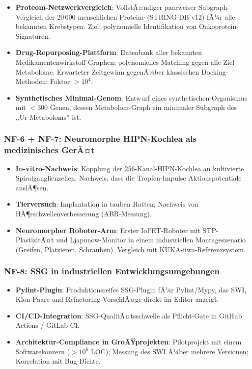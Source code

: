 ﻿\documentclass[a4paper,12pt]{scrreprt}
\theoremstyle{definition}
\begin{document}
\begin{itemize}
  \item \textbf{Proteom-Netzwerkvergleich}: VollstÃ¤ndiger paarweiser
    Subgraph-Vergleich der 20\,000 menschlichen Proteine (STRING-DB v12)
    fÃ¼r alle bekannten Krebstypen. Ziel: polynomielle Identifikation
    von Onkoprotein-Signaturen.
  \item \textbf{Drug-Repurposing-Plattform}: Datenbank aller bekannten
    Medikamentenwirkstoff-Graphen; polynomielles Matching gegen alle
    Ziel-Metabolome. Erwarteter Zeitgewinn gegenÃ¼ber klassischen
    Docking-Methoden: Faktor $> 10^4$.
  \item \textbf{Synthetisches Minimal-Genom}: Entwurf eines synthetischen
    Organismus mit $< 300$ Genen, dessen Metabolom-Graph ein minimaler
    Subgraph des ,,Ur-Metaboloms'' ist.
\end{itemize}

\subsubsection{NF-6 + NF-7: Neuromorphe HIPN-Kochlea als medizinisches GerÃ¤t}

\begin{itemize}
  \item \textbf{In-vitro-Nachweis}: Kopplung der 256-Kanal-HIPN-Kochlea
    an kultivierte Spiralganglienzellen. Nachweis, dass die
    Tropfen-Impulse Aktionspotentiale auslÃ¶sen.
  \item \textbf{Tierversuch}: Implantation in tauben Ratten; Nachweis
    von HÃ¶rschwellenverbesserung (ABR-Messung).
  \item \textbf{Neuromorpher Roboter-Arm}: Erster IoFET-Roboter mit
    STP-PlastizitÃ¤t und Ljapunow-Monitor in einem industriellen
    Montageszenario (Greifen, Platzieren, Schrauben). Vergleich
    mit KUKA-iiwa-Referenzsystem.
\end{itemize}

\subsubsection{NF-8: SSG in industriellen Entwicklungsumgebungen}

\begin{itemize}
  \item \textbf{Pylint-Plugin}: Produktionsreifes SSG-Plugin fÃ¼r
    Pylint/Mypy, das SWI, Klon-Paare und Refactoring-VorschlÃ¤ge
    direkt im Editor anzeigt.
  \item \textbf{CI/CD-Integration}: SSG-QualitÃ¤tsschwelle als
    Pflicht-Gate in GitHub Actions / GitLab CI.
  \item \textbf{Architektur-Compliance in GroÃŸprojekten}: Pilotprojekt
    mit einem Softwarekonzern ($> 10^6$ LOC); Messung des
    SWI Ã¼ber mehrere Versionen; Korrelation mit Bug-Dichte.
\end{itemize}
\end{document}
